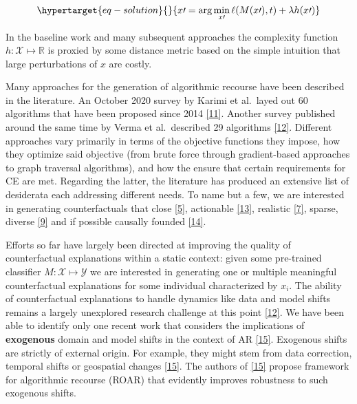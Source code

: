 \documentclass[
  conference]{IEEEtran}
\begin{document}
\begin{equation}\protect\hypertarget{eq-solution}{}{
x\prime = \arg \min_{x\prime}  \ell(M(x\prime),t) + \lambda h(x\prime)
}\label{eq-solution}\end{equation}

In the baseline work and many subsequent approaches the complexity
function \(h: \mathcal{X} \mapsto \mathbb{R}\) is proxied by some
distance metric based on the simple intuition that large perturbations
of \(x\) are costly.

Many approaches for the generation of algorithmic recourse have been
described in the literature. An October 2020 survey by Karimi et
al.~layed out 60 algorithms that have been proposed since 2014
\protect\hyperlink{ref-karimi2020survey}{{[}11{]}}. Another survey
published around the same time by Verma et al.~described 29 algorithms
\protect\hyperlink{ref-verma2020counterfactual}{{[}12{]}}. Different
approaches vary primarily in terms of the objective functions they
impose, how they optimize said objective (from brute force through
gradient-based approaches to graph traversal algorithms), and how the
ensure that certain requirements for CE are met. Regarding the latter,
the literature has produced an extensive list of desiderata each
addressing different needs. To name but a few, we are interested in
generating counterfactuals that close
\protect\hyperlink{ref-wachter2017counterfactual}{{[}5{]}}, actionable
\protect\hyperlink{ref-ustun2019actionable}{{[}13{]}}, realistic
\protect\hyperlink{ref-schut2021generating}{{[}7{]}}, sparse, diverse
\protect\hyperlink{ref-mothilal2020explaining}{{[}9{]}} and if possible
causally founded
\protect\hyperlink{ref-karimi2021algorithmic}{{[}14{]}}.

Efforts so far have largely been directed at improving the quality of
counterfactual explanations within a static context: given some
pre-trained classifier \(M: \mathcal{X} \mapsto \mathcal{Y}\) we are
interested in generating one or multiple meaningful counterfactual
explanations for some individual characterized by \(x_i\). The ability
of counterfactual explanations to handle dynamics like data and model
shifts remains a largely unexplored research challenge at this point
\protect\hyperlink{ref-verma2020counterfactual}{{[}12{]}}. We have been
able to identify only one recent work that considers the implications of
\textbf{exogenous} domain and model shifts in the context of AR
\protect\hyperlink{ref-upadhyay2021towards}{{[}15{]}}. Exogenous shifts
are strictly of external origin. For example, they might stem from data
correction, temporal shifts or geospatial changes
\protect\hyperlink{ref-upadhyay2021towards}{{[}15{]}}. The authors of
\protect\hyperlink{ref-upadhyay2021towards}{{[}15{]}} propose framework
for algorithmic recourse (ROAR) that evidently improves robustness to
such exogenous shifts.
\end{document}
